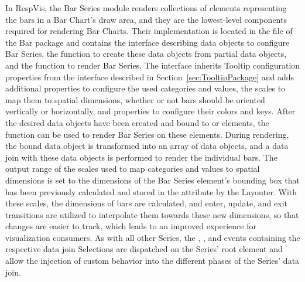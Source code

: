 In RespVis, the Bar Series module renders collections of
 elements representing the bars in a Bar Chart's draw
area, and they are the lowest-level components required for rendering
Bar Charts. Their implementation is located in the
 file of the Bar package and contains the
 interface describing data objects to configure Bar
Series, the  function to create these data objects
from partial data objects, and the  function to
render Bar Series. The  interface inherits Tooltip
configuration properties from the 
interface described in Section~\ref{sec:TooltipPackage} and adds
additional properties to configure the used categories and values, the
scales to map them to spatial dimensions, whether or not bars should
be oriented vertically or horizontally, and properties to configure
their colors and keys. After the desired  data objects
have been created and bound to  or 
elements, the  function can be used to render
Bar Series on these elements. During rendering, the bound
 data object is transformed into an array of
 data objects, and a data join with these data objects is
performed to render the individual bars. The output range of the
scales used to map categories and values to spatial dimensions is set
to the dimensions of the Bar Series element's bounding box that has
been previously calculated and stored in the 
attribute by the Layouter. With these scales, the dimensions of bars
are calculated, and enter, update, and exit transitions are utilized
to interpolate them towards these new dimensions, so that changes are
easier to track, which leads to an improved experience for
visualization consumers. As with all other Series, the ,
, and  events containing the respective data
join Selections are dispatched on the Series' root element and allow
the injection of custom behavior into the different phases of the
Series' data join.

